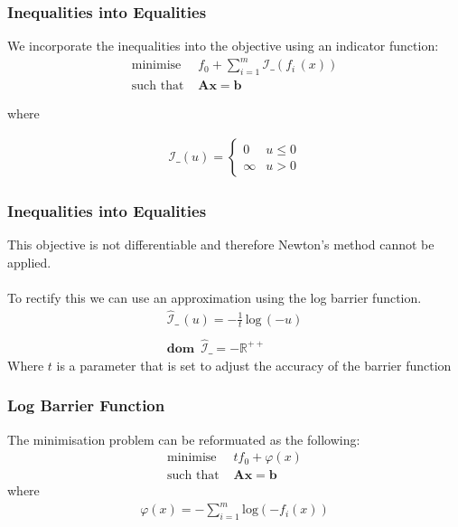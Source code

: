 \documentclass{beamer}
\def\rnum{\mathbb{R}}
\begin{document}
\begin{frame}
    \frametitle{Inequalities into Equalities}
    We incorporate the inequalities into the objective using an indicator
    function:
    \begin{align*}
        \text{minimise } \, &f_{0} +
        \sum_{i=1}^{m}\mathcal{I}\_\left(f_{i}\,(x)\right )\\
        \text{such that } & \mathbf{A}\mathbf{x} =\mathbf{b}
    \end{align*}

where

\begin{align*}
    \mathcal{I}\_(u) =
    \begin{cases}
        0 &u \leq 0 \\
        \infty &u > 0
    \end{cases}
\end{align*}
\end{frame}

\begin{frame}
    \frametitle{Inequalities into Equalities}
    This objective is not differentiable and therefore Newton's method cannot be
    applied.
    \\~\\
    To rectify this we can use an approximation using the log barrier function.
    \begin{align*}
        \hat{\mathcal{I}}\_\, (u) = -\frac{1}{t}\, \text{log}\,(-u) \\\\
        \mathbf{dom} \,\,\,\hat{\mathcal{I}}\_ = -\rnum^{++}
    \end{align*}
    Where $t$ is a parameter that is set to adjust the accuracy of the barrier
    function
\end{frame}

\begin{frame}
    \frametitle{Log Barrier Function}
    The minimisation problem can be reformuated as the following:
    \begin{align*}
        \text{minimise } \, &t f_{0} +
        \varphi(x)\\
        \text{such that } & \mathbf{A}\mathbf{x} =\mathbf{b}
    \end{align*}
    where
    \begin{align*}
        \varphi(x) = - \sum\limits_{i=1}^{m}\text{log}(-f_{i}(x))
    \end{align*}
\end{frame}
\end{document}
